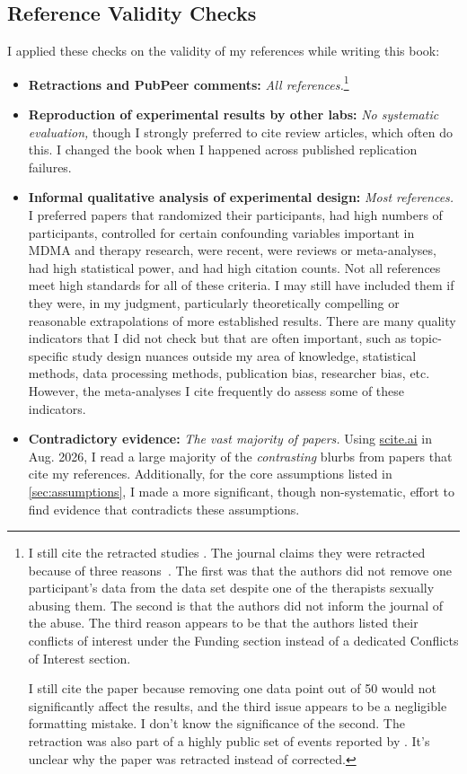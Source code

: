 \documentclass[11pt,oneside]{book}
\let\cite\parencite
\begin{document}
\subsection*{Reference Validity Checks}
I applied these checks on the validity of my references while writing this book:
\begin{itemize}
    \item \textbf{Retractions and PubPeer comments:} \textit{All references.}\footnote{I still cite the retracted studies \textcite{feducciaSSRIDiscontinuation,mithoeferRETRACTEDARTICLEMDMAassisted2019}. The journal claims they were retracted because of three reasons~\cite{feduccia2024retraction,nytimesRetraction}. The first was that the authors did not remove one participant's data from the data set despite one of the therapists sexually abusing them. The second is that the authors did not inform the journal of the abuse. The third reason appears to be that the authors listed their conflicts of interest under the Funding section instead of a dedicated Conflicts of Interest section.
    
    I still cite the paper because removing one data point out of 50 would not significantly affect the results, and the third issue appears to be a negligible formatting mistake. I don't know the significance of the second. The retraction was also part of a highly public set of events reported by \textcite{nytPsymposia}. It's unclear why the paper was retracted instead of corrected.}
    \item \textbf{Reproduction of experimental results by other labs:} \textit{No systematic evaluation,} though I strongly preferred to cite review articles, which often do this. I changed the book when I happened across published replication failures.
    \item \textbf{Informal qualitative analysis of experimental design:} \textit{Most references.} I preferred papers that randomized their participants, had high numbers of participants, controlled for certain confounding variables important in MDMA and therapy research, were recent, were reviews or meta-analyses, had high statistical power, and had high citation counts. Not all references meet high standards for all of these criteria. I may still have included them if they were, in my judgment, particularly theoretically compelling or reasonable extrapolations of more established results. There are many quality indicators that I did not check but that are often important, such as topic-specific study design nuances outside my area of knowledge, statistical methods, data processing methods, publication bias, researcher bias, etc. However, the meta-analyses I cite frequently do assess some of these indicators.
    \item \textbf{Contradictory evidence:} \textit{The vast majority of papers.} Using \href{https://scite.ai}{scite.ai} in Aug. 2026, I read a large majority of the \textit{contrasting} blurbs from papers that cite my references. Additionally, for the core assumptions listed in \cref{sec:assumptions}, I made a more significant, though non-systematic, effort to find evidence that contradicts these assumptions.
\end{itemize}
\end{document}
